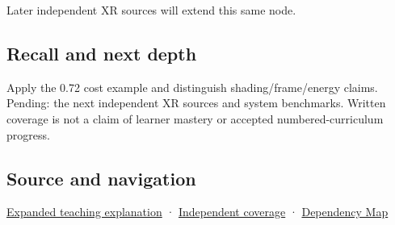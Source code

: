 Later independent XR sources will extend this same node.

\subsection{Recall and next depth}\label{appendix-5878b813b732-recall-and-next-depth}

Apply the 0.72 cost example and distinguish shading/frame/energy claims. Pending: the next independent XR sources and system benchmarks. Written coverage is not a claim of learner mastery or accepted numbered-curriculum progress.

\subsection{Source and navigation}\label{appendix-5878b813b732-source-and-navigation}

\hyperref[04-visual-computing-ii-ch042-foveation-is-allocation-under-uncertain-perception-and-timing]{Expanded teaching explanation} · \hyperref[appendix-fd090d982a15-xr01---independent-seeing-and-representation-source]{Independent coverage} · \hyperref[appendix-4ad47bdd269a]{Dependency Map}
